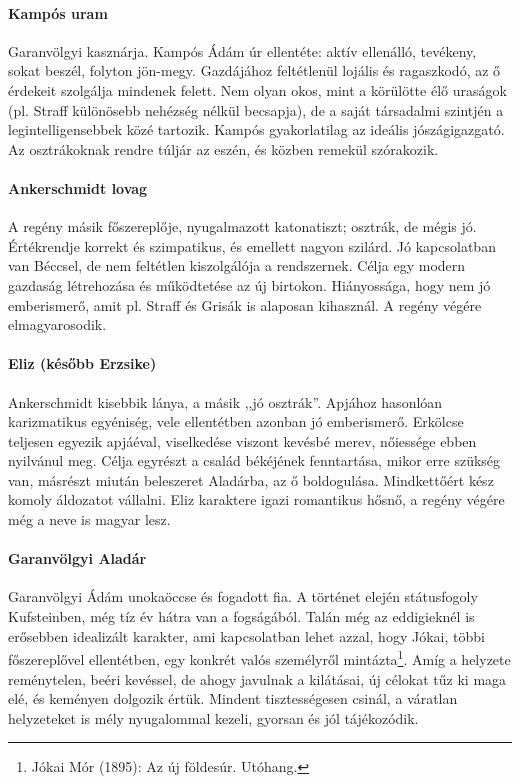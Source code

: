 \documentclass{thesis-ekf}
\begin{document}
    \paragraph{Kampós uram}
    Garanvölgyi kasznárja.
    Kampós Ádám úr ellentéte: aktív ellenálló, tevékeny, sokat beszél, folyton jön-megy.
    Gazdájához feltétlenül lojális és ragaszkodó, az ő érdekeit szolgálja mindenek felett.
    Nem olyan okos, mint a körülötte élő uraságok (pl.
    Straff különösebb nehézség nélkül becsapja), de a saját társadalmi szintjén a legintelligensebbek közé tartozik.
    Kampós gyakorlatilag az ideális jószágigazgató.
    Az osztrákoknak rendre túljár az eszén, és közben remekül szórakozik.

    \paragraph{Ankerschmidt lovag}
    A regény másik főszereplője, nyugalmazott katonatiszt; osztrák, de mégis jó.
    Értékrendje korrekt és szimpatikus, és emellett nagyon szilárd.
    Jó kapcsolatban van Béccsel, de nem feltétlen kiszolgálója a rendszernek.
    Célja egy modern gazdaság létrehozása és működtetése az új birtokon.
    Hiányossága, hogy nem jó emberismerő, amit pl.
    Straff és Grisák is alaposan kihasznál.
    A regény végére elmagyarosodik.

    \paragraph{Eliz (később Erzsike)}
    Ankerschmidt kisebbik lánya, a másik ,,jó osztrák''.
    Apjához hasonlóan karizmatikus egyéniség, vele ellentétben azonban jó emberismerő.
    Erkölcse teljesen egyezik apjáéval, viselkedése viszont kevésbé merev, nőiessége ebben nyilvánul meg.
    Célja egyrészt a család békéjének fenntartása, mikor erre szükség van, másrészt miután beleszeret Aladárba, az ő boldogulása.
    Mindkettőért kész komoly áldozatot vállalni.
    Eliz karaktere igazi romantikus hősnő, a regény végére még a neve is magyar lesz.

    \paragraph{Garanvölgyi Aladár}
    Garanvölgyi Ádám unokaöccse és fogadott fia.
    A történet elején státusfogoly Kufsteinben, még tíz év hátra van a fogságából.
    Talán még az eddigieknél is erősebben idealizált karakter, ami kapcsolatban lehet azzal, hogy Jókai,
        többi főszereplővel ellentétben, egy konkrét valós személyről mintázta\footnote{
        Jókai Mór (1895): Az új földesúr. Utóhang.
    }.
    Amíg a helyzete reménytelen, beéri kevéssel, de ahogy javulnak a kilátásai, új célokat tűz ki maga elé,
        és keményen dolgozik értük.
    Mindent tisztességesen csinál, a váratlan helyzeteket is mély nyugalommal kezeli, gyorsan és jól tájékozódik.
\end{document}
